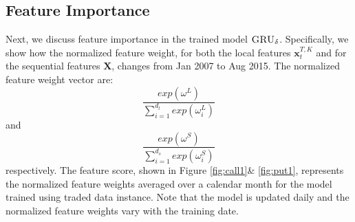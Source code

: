\documentclass[letterpaper,12pt,titlepage,oneside,final]{book}
\numberwithin{equation}{section}
\theoremstyle{definition}
\newcommand{\model}{\textsc{GRU}_\delta}
\newcommand{\vx}{\mathbf{x}}
\begin{document}
\subsection{Feature Importance}\label{sec:featureWeek}
Next, we discuss feature importance in the trained model $\model$. Specifically, we show how the normalized feature weight, for both the local features $\vx_{t}^{T,K}$ and for the sequential features $\mathbf{X}$,  changes from Jan 2007 to Aug 2015. 
The normalized feature weight vector are:
\[
\frac{exp(\omega^L)}{\sum_{i=1}^{d_l} exp(\omega^L_i)}
\]
and
\[
\frac{exp(\omega^S)}{\sum_{i=1}^{d_s} exp(\omega^S_i)}
\]
respectively.
The feature score, shown in Figure \ref{fig:call1}\& \ref{fig:put1}, represents the normalized feature weights averaged over a calendar month for the model trained using {traded} data instance. Note that
the model is updated daily and  the normalized feature weights vary with the training date.
\end{document}
